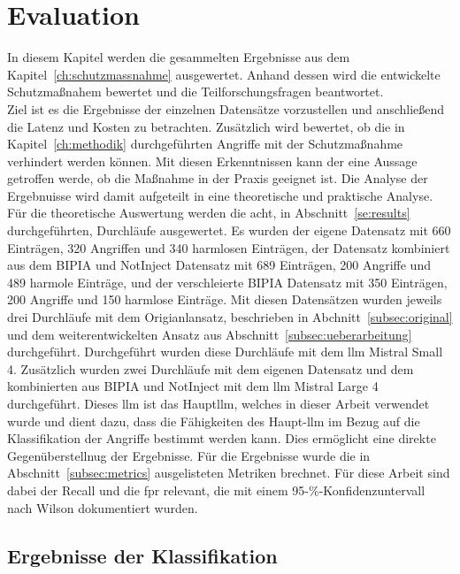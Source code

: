 \chapter{Evaluation}\label{ch:evaluation}

In diesem Kapitel werden die gesammelten Ergebnisse aus dem Kapitel~\ref{ch:schutzmassnahme} ausgewertet. Anhand dessen wird die entwickelte Schutzmaßnahem bewertet
und die Teilforschungsfragen beantwortet. \\
Ziel ist es die Ergebnisse der einzelnen Datensätze vorzustellen und anschließend die Latenz und Kosten zu betrachten. Zusätzlich wird bewertet, ob die in 
Kapitel~\ref{ch:methodik} durchgeführten Angriffe mit der Schutzmaßnahme verhindert werden können. Mit diesen Erkenntnissen kann der eine Aussage getroffen werde,
ob die Maßnahme in der Praxis geeignet ist. Die Analyse der Ergebnuisse wird damit aufgeteilt in eine theoretische und praktische Analyse. \\
Für die theoretische Auswertung werden die acht, in Abschnitt~\ref{se:results} durchgeführten, Durchläufe ausgewertet. Es wurden der eigene Datensatz mit 
660 Einträgen, 320 Angriffen und 340 harmlosen Einträgen, der Datensatz kombiniert aus dem BIPIA und NotInject Datensatz mit 689 Einträgen, 200 Angriffe und 489
harmole Einträge, und der verschleierte BIPIA Datensatz mit 350 Einträgen, 200 Angriffe und 150 harmlose Einträge. Mit diesen Datensätzen wurden jeweils drei 
Durchläufe mit dem Origianlansatz, beschrieben in Abchnitt~\ref{subsec:original} und dem weiterentwickelten Ansatz aus Abschnitt~\ref{subsec:ueberarbeitung} 
durchgeführt. Durchgeführt wurden diese
Durchläufe mit dem \ac{llm} Mistral Small 4. Zusätzlich wurden zwei Durchläufe mit dem eigenen Datensatz und dem kombinierten aus BIPIA und NotInject mit dem
\ac{llm} Mistral Large 4 durchgeführt. Dieses \ac{llm} ist das Haupt\ac{llm}, welches in dieser Arbeit verwendet wurde und dient dazu, dass die Fähigkeiten
des Haupt-\ac{llm} im Bezug auf die Klassifikation der Angriffe bestimmt werden kann. Dies ermöglicht eine direkte Gegenüberstellnug der Ergebnisse. Für die Ergebnisse
wurde die in Abschnitt~\ref{subsec:metrics} ausgelisteten Metriken brechnet. Für diese Arbeit sind dabei der Recall und die \ac{fpr} relevant, die mit einem 
95-\%-Konfidenzuntervall nach Wilson dokumentiert wurden. \\

\section{Ergebnisse der Klassifikation}

